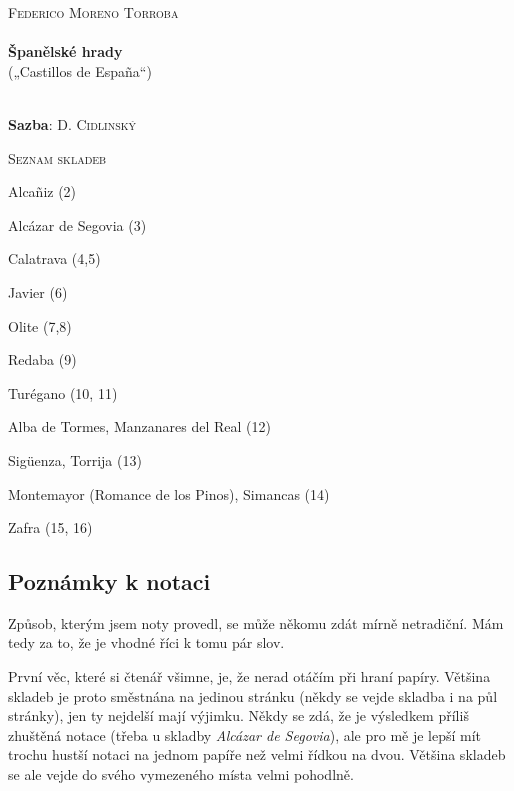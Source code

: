 \documentclass[11pt,a4paper]{article}
\begin{document}
\begin{titlepage}
\begin{center}

{\Large \textsc{Federico Moreno Torroba}} \\[1.2cm]

\cara \\[0.5cm]
{\huge \textbf{Španělské hrady}} \\[0.6cm]
{\Large („Castillos de España“)} \\[6mm]
\cara \\[1.2cm]

\end{center}

{\large \textbf{Sazba}: \textsc{D. Cidlinský}}\\[1cm]

\begin{center}
{\huge\scshape Seznam skladeb}\\[6mm]
\end{center}

Alcañiz (2)

Alcázar de Segovia (3)

Calatrava (4,5)

Javier (6)

Olite (7,8)

Redaba (9)

Turégano (10, 11)

Alba de Tormes, Manzanares del Real (12)

Sigüenza, Torrija (13)

Montemayor (Romance de los Pinos), Simancas (14)

Zafra (15, 16)
\vfill
\end{titlepage}

\begin{comment}
\newpage
\mbox{}
\thispagestyle{empty}
\newpage
\end{comment}
\subsection{Poznámky k notaci}

Způsob, kterým jsem noty provedl, se může někomu zdát mírně netradiční. Mám tedy za to, že je vhodné říci k tomu pár slov.

První věc, které si čtenář všimne, je, že nerad otáčím při hraní papíry. Většina skladeb je proto směstnána na jedinou stránku (někdy se vejde skladba i na půl stránky), jen ty nejdelší mají výjimku. Někdy se zdá, že je výsledkem příliš zhuštěná notace (třeba u skladby \emph{Alcázar de Segovia}), ale pro mě je lepší mít trochu hustší notaci na jednom papíře než velmi řídkou na dvou. Většina skladeb se ale vejde do svého vymezeného místa velmi pohodlně.
\end{document}
